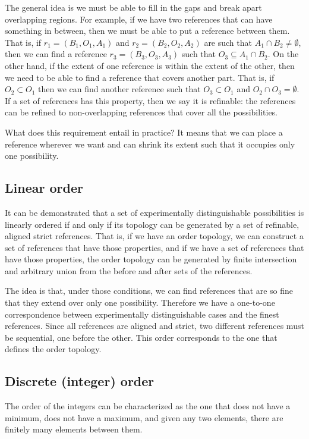 \documentclass[12pt]{iopart}
\begin{document}
The general idea is we must be able to fill in the gaps and break apart overlapping regions. For example, if we have two references that can have something in between, then we must be able to put a reference between them. That is, if $r_1 = (B_1, O_1, A_1)$ and $r_2 = (B_2, O_2, A_2)$ are such that $A_1 \cap B_2 \neq \emptyset$, then we can find a reference $r_3 = (B_3, O_3, A_3)$ such that $O_3 \subseteq A_1 \cap B_2$. On the other hand, if the extent of one reference is within the extent of the other, then we need to be able to find a reference that covers another part. That is, if $O_2 \subset O_1$ then we can find another reference such that $O_3 \subset O_1$ and $O_2 \cap O_3 = \emptyset$. If a set of references has this property, then we say it is refinable: the references can be refined to non-overlapping references that cover all the possibilities.

What does this requirement entail in practice? It means that we can place a reference wherever we want and can shrink its extent such that it occupies only one possibility.

\subsection{Linear order}

It can be demonstrated that a set of experimentally distinguishable possibilities is linearly ordered if and only if its topology can be generated by a set of refinable, aligned strict references. That is, if we have an order topology, we can construct a set of references that have those properties, and if we have a set of references that have those properties, the order topology can be generated by finite intersection and arbitrary union from the before and after sets of the references.

The idea is that, under those conditions, we can find references that are so fine that they extend over only one possibility. Therefore we have a one-to-one correspondence between experimentally distinguishable cases and the finest references. Since all references are aligned and strict, two different references must be sequential, one before the other. This order corresponds to the one that defines the order topology.

\subsection{Discrete (integer) order}

The order of the integers can be characterized as the one that does not have a minimum, does not have a maximum, and given any two elements, there are finitely many elements between them.
\end{document}
